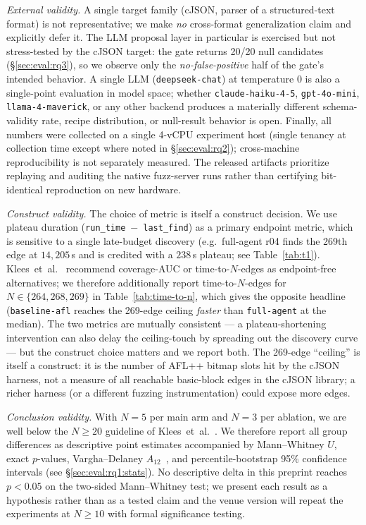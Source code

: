 \documentclass[11pt]{article}
\begin{document}
\emph{External validity.} A single target family (cJSON, parser
of a structured-text format) is not representative; we make
\emph{no} cross-format generalization claim and explicitly defer
it. The LLM proposal layer in particular is exercised but not
stress-tested by the cJSON target: the gate returns 20/20 null
candidates (\S\ref{sec:eval:rq3}), so we observe only the
\emph{no-false-positive} half of the gate's intended behavior.
A single LLM (\texttt{deepseek-chat}) at temperature 0 is also a
single-point evaluation in model space; whether
\texttt{claude-haiku-4-5}, \texttt{gpt-4o-mini},
\texttt{llama-4-maverick}, or any other backend produces a
materially different schema-validity rate, recipe distribution,
or null-result behavior is open. Finally, all numbers were
collected on a single 4-vCPU experiment host (single tenancy at
collection time except where noted in \S\ref{sec:eval:rq2});
cross-machine reproducibility is not separately measured. The
released artifacts prioritize replaying and auditing the native
fuzz-server runs rather than certifying bit-identical reproduction on
new hardware.

\emph{Construct validity.} The choice of metric is itself a
construct decision. We use plateau duration
(\texttt{run\_time}~$-$~\texttt{last\_find}) as a primary
endpoint metric, which is sensitive to a single
late-budget discovery (e.g.~full-agent r04 finds the 269th edge
at $14{,}205$\,s and is credited with a $238$\,s plateau; see
Table~\ref{tab:t1}). Klees~et~al.~\cite{klees2018evaluating}
recommend coverage-AUC or time-to-$N$-edges as endpoint-free
alternatives; we therefore additionally report time-to-$N$-edges
for $N\in\{264, 268, 269\}$ in
Table~\ref{tab:time-to-n}, which gives the opposite headline
(\texttt{baseline-afl} reaches the 269-edge ceiling \emph{faster}
than \texttt{full-agent} at the median). The two metrics are
mutually consistent --- a plateau-shortening intervention can
also delay the ceiling-touch by spreading out the discovery
curve --- but the construct choice matters and we report both.
The 269-edge ``ceiling'' is itself a construct: it is the number
of AFL++ bitmap slots hit by the cJSON harness, not a measure of
all reachable basic-block edges in the cJSON library; a richer
harness (or a different fuzzing instrumentation) could expose
more edges.

\emph{Conclusion validity.} With $N{=}5$ per main arm and
$N{=}3$ per ablation, we are well below the
$N{\geq}20$ guideline of
Klees~et~al.~\cite{klees2018evaluating}. We therefore report all
group differences as descriptive point estimates accompanied by
Mann--Whitney $U$, exact $p$-values, Vargha--Delaney
$A_{12}$~\cite{vargha2000critique}, and percentile-bootstrap
95\% confidence intervals (see \S\ref{sec:eval:rq1:stats}). No
descriptive delta in this preprint reaches $p{<}0.05$ on the
two-sided Mann--Whitney test; we present each result as a
hypothesis rather than as a tested claim and the venue version
will repeat the experiments at $N{\geq}10$ with formal
significance testing.
\end{document}
